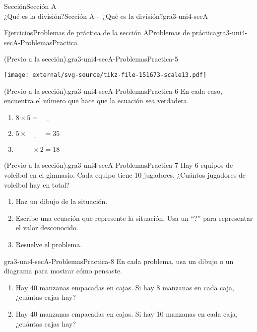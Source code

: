 \begin{sectionptx}{Sección}{{\Large Sección A\\}¿Qué es la división?}{}{Sección A -~¿Qué es la división?}{}{}{gra3-uni4-secA}
\begin{exercises-subsection}{Ejercicios}{Problemas de práctica de la sección A}{}{Problemas de práctica}{}{}{gra3-uni4-secA-ProblemasPractica}
\begin{divisionexercise}{3}{(Previo a la sección).}{}{gra3-uni4-secA-ProblemasPractica-5}
\begin{sidebyside}{2}{0}{0}{0}
\begin{sbspanel}{0.5}
\texttt{[image: external/svg-source/tikz-file-151673-scale13.pdf]}
\end{sbspanel}%
\end{sidebyside}%
\end{divisionexercise}%
\begin{divisionexercise}{4}{(Previo a la sección).}{}{gra3-uni4-secA-ProblemasPractica-6}%
En cada caso, encuentra el número que hace que la ecuación sea verdadera.%
\par
%
\begin{enumerate}[label={(\alph*)}]
\item{}\(\displaystyle 8 \times 5 = \underline{\hspace{1cm}}\)%
\item{}\(\displaystyle 5 \times \underline{\hspace{1cm}} = 35\)%
\item{}\(\displaystyle \underline{\hspace{1cm}} \times 2 = 18\)%
\end{enumerate}
%
\end{divisionexercise}%
\begin{divisionexercise}{5}{(Previo a la sección).}{}{gra3-uni4-secA-ProblemasPractica-7}%
Hay 6 equipos de voleibol en el gimnasio. Cada equipo tiene 10 jugadores. ¿Cuántos jugadores de voleibol hay en total?%
\par
%
\begin{enumerate}[label={(\alph*)}]
\item{}Haz un dibujo de la situación.%
\item{}Escribe una ecuación que represente la situación. Usa un “?” para representar el valor desconocido.%
\item{}Resuelve el problema.%
\end{enumerate}
%
\end{divisionexercise}%
\begin{divisionexercise}{6}{}{}{gra3-uni4-secA-ProblemasPractica-8}%
En cada problema, usa un dibujo o un diagrama para mostrar cómo pensaste.%
\par
%
\begin{enumerate}[label={(\alph*)}]
\item{}Hay 40 manzanas empacadas en cajas. Si hay 8 manzanas en cada caja, ¿cuántas cajas hay?%
\item{}Hay 40 manzanas empacadas en cajas. Si hay 10 manzanas en cada caja, ¿cuántas cajas hay?%
\end{enumerate}
%
\end{divisionexercise}%

\end{exercises-subsection}
\end{sectionptx}
